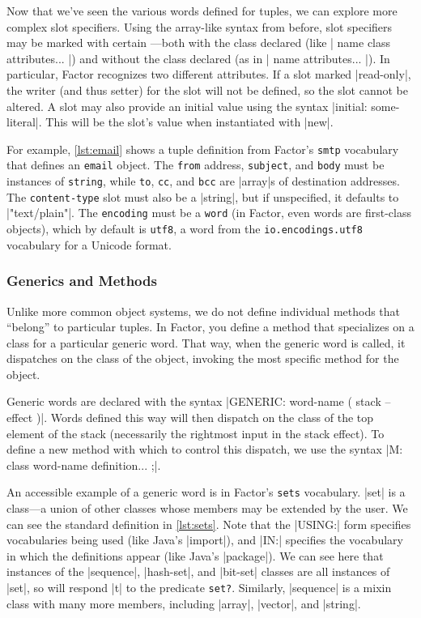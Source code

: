 
Now that we've seen the various words defined for tuples, we can explore more
complex slot specifiers.  Using the array-like syntax from before, slot
specifiers may be marked with certain ---both with the class
declared (like
%
\factor|{ name class attributes... }|)
%
and without the class declared (as in 
%
\factor|{ name attributes... }|).
%
In particular, Factor recognizes two different attributes.  If a slot marked
\factor|read-only|, the writer (and thus setter) for the slot will not be
defined, so the slot cannot be altered.  A slot may also provide an initial
value using the syntax \factor|initial: some-literal|.  This will be the slot's
value when instantiated with \factor|new|. 

For example, \vref{lst:email} shows a tuple definition from Factor's
\Verb|smtp| vocabulary that defines an \Verb|email| object.  The
\Verb|from| address, \Verb|subject|, and \Verb|body| must be instances of
\Verb|string|, while \Verb|to|, \Verb|cc|, and \Verb|bcc| are
\factor|array|s of destination addresses.  The \Verb|content-type| slot must
also be a \factor|string|, but if unspecified, it defaults to
\factor|"text/plain"|.  The \Verb|encoding| must be a \Verb|word| (in
Factor, even words are first-class objects), which by default is \Verb|utf8|,
a word from the \Verb|io.encodings.utf8| vocabulary for a Unicode format.

\subsubsection{Generics and Methods}

Unlike more common object systems, we do not define individual methods that
``belong'' to particular tuples.  In Factor, you define a method that
specializes on a class for a particular generic word.  That way, when the
generic word is called, it dispatches on the class of the object, invoking the
most specific method for the object.

Generic words are declared with the syntax
%
\factor|GENERIC: word-name ( stack -- effect )|.
%
Words defined this way will then dispatch on the class of the top element of
the stack (necessarily the rightmost input in the stack effect).  To define a
new method with which to control this dispatch, we use the syntax
%
\factor|M: class word-name definition... ;|.


An accessible example of a generic word is in Factor's \Verb|sets|
vocabulary.  \factor|set| is a  class---a union of other classes
whose members may be extended by the user.  We can see the standard definition
in \vref{lst:sets}.  Note that the \factor|USING:| form specifies vocabularies
being used (like Java's |import|), and \factor|IN:| specifies the
vocabulary in which the definitions appear (like Java's |package|).
We can see here that instances of the \factor|sequence|, \factor|hash-set|, and
\factor|bit-set| classes are all instances of \factor|set|, so will respond
\factor|t| to the predicate \Verb|set?|.  Similarly, \factor|sequence| is a
mixin class with many more members, including \factor|array|, \factor|vector|,
and \factor|string|.

